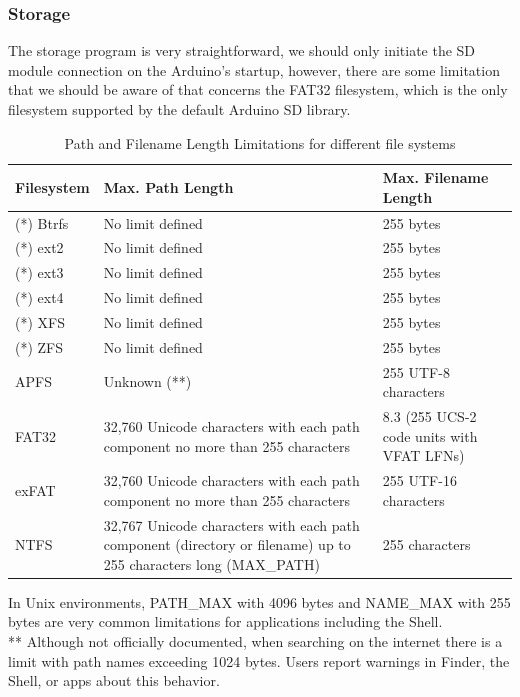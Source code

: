 \subsubsection{Storage}
The storage program is very straightforward, we should only initiate the SD module connection on the Arduino's startup, however, there are some limitation that we should be aware of that concerns the FAT32 filesystem, which is the only filesystem supported by the default Arduino SD library. \\
\begin{table}[H]
    \centering
    \begin{tabular}{|l|p{9cm}|p{5cm}|}
    \hline
    Filesystem & Max. Path Length & Max. Filename Length \\
    \hline
    (*) Btrfs & No limit defined & 255 bytes \\
    \hline
    (*) ext2 & No limit defined & 255 bytes \\
    \hline
    (*) ext3 & No limit defined & 255 bytes \\
    \hline
    (*) ext4 & No limit defined & 255 bytes \\
    \hline
    (*) XFS & No limit defined & 255 bytes \\
    \hline
    (*) ZFS & No limit defined & 255 bytes \\
    \hline
    APFS & Unknown (**) & 255 UTF-8 characters \\
    \hline
    \rowcolor{red!25} FAT32 & 32,760 Unicode characters with each path component no more than 255 characters & 8.3 (255 UCS-2 code units with VFAT LFNs) \\
    \hline
    exFAT & 32,760 Unicode characters with each path component no more than 255 characters & 255 UTF-16 characters \\
    \hline
    NTFS & 32,767 Unicode characters with each path component (directory or filename) up to 255 characters long (MAX\_PATH) & 255 characters \\
    \hline
    \end{tabular}
    \caption{Path and Filename Length Limitations for different file systems}
\end{table}
{\footnotesize * In Unix environments, PATH\_MAX with 4096 bytes and NAME\_MAX with 255 bytes are very common limitations for applications including the Shell. \\
** Although not officially documented, when searching on the internet there is a limit with path names exceeding 1024 bytes. Users report warnings in Finder, the Shell, or apps about this behavior. }\\


